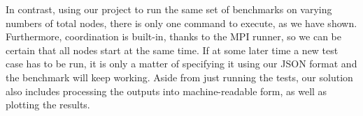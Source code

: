 In contrast, using our project to run the same set of benchmarks on varying numbers of total nodes, there is only one command to execute, as we have shown. Furthermore, coordination is built-in, thanks to the MPI runner, so we can be certain that all nodes start at the same time. If at some later time a new test case has to be run, it is only a matter of specifying it using our JSON format and the benchmark will keep working. Aside from just running the tests, our solution also includes processing the outputs into machine-readable form, as well as plotting the results.
